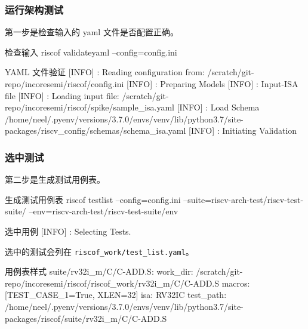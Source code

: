 \documentclass[xcolor=table,dvipsnames,svgnames,aspectratio=169]{ctexbeamer}
\begin{document}
\begin{frame}
  \frametitle{运行架构测试}

  第一步是检查输入的 yaml 文件是否配置正确。

  \begin{codeblock}[language=bash]{检查输入}
riscof validateyaml --config=config.ini
  \end{codeblock}
  \begin{codeblock}{YAML 文件验证}
[INFO]    : Reading configuration from: /scratch/git-repo/incoresemi/riscof/config.ini
[INFO]    : Preparing Models
[INFO]    : Input-ISA file
[INFO]    : Loading input file: /scratch/git-repo/incoresemi/riscof/spike/sample_isa.yaml
[INFO]    : Load Schema /home/neel/.pyenv/versions/3.7.0/envs/venv/lib/python3.7/site-packages/riscv_config/schemas/schema_isa.yaml
[INFO]    : Initiating Validation
  \end{codeblock}
\end{frame}

\begin{frame}
  \frametitle{选中测试}

  第二步是生成测试用例表。

  \begin{codeblock}[language=bash]{生成测试用例表}
riscof testlist --config=config.ini --suite=riscv-arch-test/riscv-test-suite/ --env=riscv-arch-test/riscv-test-suite/env
  \end{codeblock}
  \begin{codeblock}[language=bash]{选中用例}
[INFO]    : Selecting Tests.
  \end{codeblock}

  选中的测试会列在 \lstinline|riscof_work/test_list.yaml|。

  \begin{codeblock}{用例表样式}
suite/rv32i_m/C/C-ADD.S:
  work_dir: /scratch/git-repo/incoresemi/riscof/riscof_work/rv32i_m/C/C-ADD.S
  macros: [TEST_CASE_1=True, XLEN=32]
  isa: RV32IC
  test_path: /home/neel/.pyenv/versions/3.7.0/envs/venv/lib/python3.7/site-packages/riscof/suite/rv32i_m/C/C-ADD.S
  \end{codeblock}

\end{frame}
\end{document}
